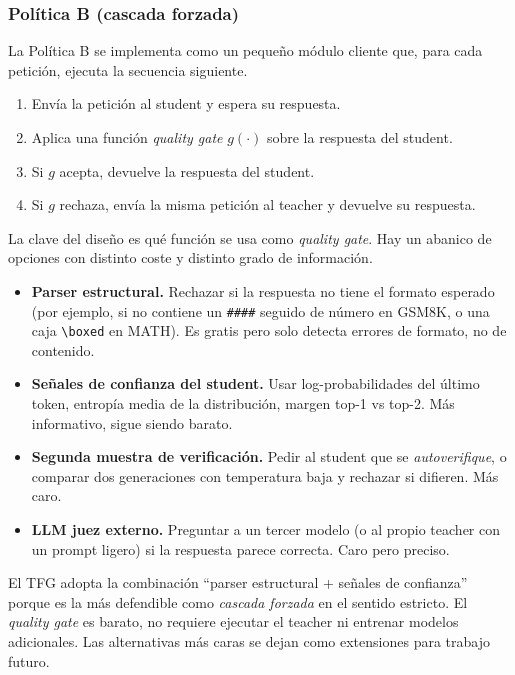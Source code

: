 \documentclass[11pt,a4paper]{article}
\begin{document}
\subsubsection{Política B (cascada forzada)}

La Política B se implementa como un pequeño módulo cliente que, para cada petición, ejecuta la secuencia siguiente.
\begin{enumerate}[nosep,leftmargin=*]
\item Envía la petición al student y espera su respuesta.
\item Aplica una función \textit{quality gate} $g(\cdot)$ sobre la respuesta del student.
\item Si $g$ acepta, devuelve la respuesta del student.
\item Si $g$ rechaza, envía la misma petición al teacher y devuelve su respuesta.
\end{enumerate}

La clave del diseño es qué función se usa como \textit{quality gate}. Hay un abanico de opciones con distinto coste y distinto grado de información.
\begin{itemize}[nosep,leftmargin=*]
\item \textbf{Parser estructural.} Rechazar si la respuesta no tiene el formato esperado (por ejemplo, si no contiene un \texttt{\#\#\#\#} seguido de número en GSM8K, o una caja \texttt{\textbackslash boxed} en MATH). Es gratis pero solo detecta errores de formato, no de contenido.
\item \textbf{Señales de confianza del student.} Usar log-probabilidades del último token, entropía media de la distribución, margen top-1 vs top-2. Más informativo, sigue siendo barato.
\item \textbf{Segunda muestra de verificación.} Pedir al student que se \textit{autoverifique}, o comparar dos generaciones con temperatura baja y rechazar si difieren. Más caro.
\item \textbf{LLM juez externo.} Preguntar a un tercer modelo (o al propio teacher con un prompt ligero) si la respuesta parece correcta. Caro pero preciso.
\end{itemize}

El TFG adopta la combinación ``parser estructural + señales de confianza'' porque es la más defendible como \textit{cascada forzada} en el sentido estricto. El \textit{quality gate} es barato, no requiere ejecutar el teacher ni entrenar modelos adicionales. Las alternativas más caras se dejan como extensiones para trabajo futuro.
\end{document}
